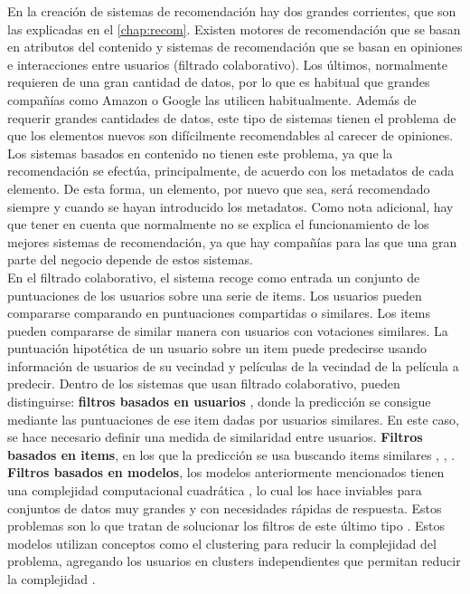 En la creación de sistemas de recomendación hay dos grandes corrientes, que son las explicadas en el \autoref{chap:recom}. Existen motores de recomendación que se basan en atributos del contenido y sistemas de recomendación que se basan en opiniones e interacciones entre usuarios (filtrado colaborativo). Los últimos, normalmente requieren de una gran cantidad de datos, por lo que es habitual que grandes compañías como Amazon \cite{Amazon} o Google \cite{Google} las utilicen habitualmente. Además de requerir grandes cantidades de datos, este tipo de sistemas tienen el problema de que los elementos nuevos son difícilmente recomendables al carecer de opiniones. Los sistemas basados en contenido no tienen este problema, ya que la recomendación se efectúa, principalmente, de acuerdo con los metadatos de cada elemento. De esta forma, un elemento, por nuevo que sea, será recomendado siempre y cuando se hayan introducido los metadatos. Como nota adicional, hay que tener en cuenta que normalmente no se explica el funcionamiento de los mejores sistemas de recomendación, ya que hay compañías para las que una gran parte del negocio depende de estos sistemas.\\

En el filtrado colaborativo, el sistema recoge como entrada un conjunto de puntuaciones de los usuarios sobre una serie de items. Los usuarios pueden compararse comparando en puntuaciones compartidas o similares. Los items pueden compararse de similar manera con usuarios con votaciones similares. La puntuación hipotética de un usuario sobre un item puede predecirse usando información de usuarios de su vecindad y películas de la vecindad de la película a predecir. Dentro de los sistemas que usan filtrado colaborativo, pueden distinguirse: \textbf{filtros basados en usuarios} \cite{resnick}, donde la predicción se consigue mediante las puntuaciones de ese item dadas por usuarios similares. En este caso, se hace necesario definir una medida de similaridad entre usuarios. \textbf{Filtros basados en items}, en los que la predicción se usa buscando items similares \cite{Amazon}, \cite{sarwar}, \cite{karypis}. \textbf{Filtros basados en modelos}, los modelos anteriormente mencionados tienen una complejidad computacional cuadrática \cite{Candiller}, lo cual los hace inviables para conjuntos de datos muy grandes y con necesidades rápidas de respuesta. Estos problemas son lo que tratan de solucionar los filtros de este último tipo \cite{breese}. Estos modelos utilizan conceptos como el clustering para reducir la complejidad del problema, agregando los usuarios en clusters independientes que permitan reducir la complejidad \cite{oconnor}.\\

